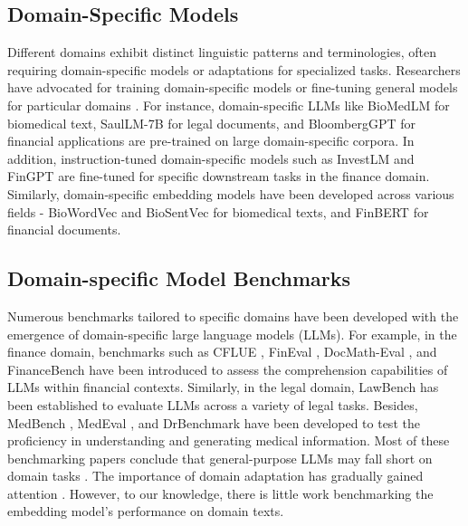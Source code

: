 \subsection{Domain-Specific Models} 
Different domains exhibit distinct linguistic patterns and terminologies, often requiring domain-specific models or adaptations for specialized tasks. Researchers have advocated for training domain-specific models or fine-tuning general models for particular domains \citep{dont_stop}. For instance, domain-specific LLMs like BioMedLM \citep{biomedlm} for biomedical text, SaulLM-7B \citep{saullm} for legal documents, and BloombergGPT \citep{bloomberggpt} for financial applications are pre-trained on large domain-specific corpora. In addition, instruction-tuned domain-specific models such as InvestLM \citep{investlm} and FinGPT \citep{fingpt} are fine-tuned for specific downstream tasks in the finance domain. Similarly, domain-specific embedding models have been developed across various fields - BioWordVec \citep{biowordvec} and BioSentVec \citep{biosentvec} for biomedical texts, and FinBERT \citep{finbert} for financial documents. 


\subsection{Domain-specific Model Benchmarks}
Numerous benchmarks tailored to specific domains have been developed with the emergence of domain-specific large language models (LLMs). For example, in the finance domain, benchmarks such as CFLUE \citep{CFLUE}, FinEval \citep{fineval}, DocMath-Eval \citep{DocMath-Eval}, and FinanceBench \citep{financebench} have been introduced to assess the comprehension capabilities of LLMs within financial contexts. Similarly, in the legal domain, LawBench \citep{lawbench} has been established to evaluate LLMs across a variety of legal tasks. Besides, MedBench \citep{medbench}, MedEval \citep{medeval}, and DrBenchmark \citep{drbenchmark} have been developed to test the proficiency in understanding and generating medical information. Most of these benchmarking papers conclude that general-purpose LLMs may fall short on domain tasks \citep{CFLUE, lawbench}. The importance of domain adaptation has gradually gained attention \citep{domainiskey}. However, to our knowledge, there is little work benchmarking the embedding model's performance on domain texts. 
